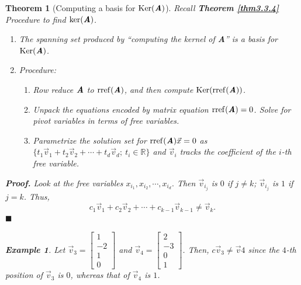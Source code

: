 \documentclass[12pt, a4paper]{article}
\newtheorem{thm}{Theorem}[subsection]
\newtheorem{eg}{Example}[subsection]
\newenvironment*{prf}{\indent\textbf{\textit{Proof. }}}{\hfill $\blacksquare$\par}
\def\R{{\mathbb{R}}}
\def\rref{\mathrm{rref}}
\def\Ker{\mathrm{Ker}}
\def\vecx{\vec{x}}
\def\vecv{\vec{v}}
\def\matrixA{\textbf{\emph{A}}}
\begin{document}
\begin{thm}[Computing a basis for $\Ker(\matrixA)$]
	Recall \textbf{Theorem \ref{thm3.3.4}} Procedure to find $\ker(\matrixA)$.
	\begin{enumerate}
		\item The spanning set produced by ``computing the kernel of \matrixA'' is a basis for $\Ker(\matrixA)$.
		\item Procedure:
		\begin{enumerate}
			\item Row reduce $\matrixA$ to $\rref(\matrixA)$, and then compute $\Ker(\rref(\matrixA))$.
			\item Unpack the equations encoded by matrix equation $\rref(\matrixA)=0$. Solve for pivot variables in terms of free variables.
			\item Parametrize the solution set for $\rref(\matrixA)\vecx=0$ as $\{t_1\vecv_1+t_2\vecv_2+\cdots+t_d\vecv_d;\ t_i\in\R\}$ and $\vecv_i$ tracks the coefficient of the $i$-th free variable.
		\end{enumerate}
	\end{enumerate}	
	\begin{prf}
		Look at the free variables $x_{i_1}, x_{i_2},\cdots,x_{i_d}.$ Then $\vecv_{i_j}$ is $0$ if $j\neq k$; $\vecv_{i_j}$ is $1$ if $j=k$. Thus, \[c_1\vecv_1+c_2\vecv_2+\cdots+c_{k-1}\vecv_{k-1}\neq\vecv_k.\]	
	\end{prf}
	\begin{eg}
		Let $\vecv_3=\begin{bmatrix}1\\-2\\1\\0\end{bmatrix}$ and $\vecv_4=\begin{bmatrix}2\\-3\\0\\1\end{bmatrix}$. Then, $c\vecv_3\neq\vecv4$ since the $4$-th position of $\vecv_3$ is $0$, whereas that of $\vecv_4$ is $1$.	
	\end{eg}
\end{thm}
\end{document}
